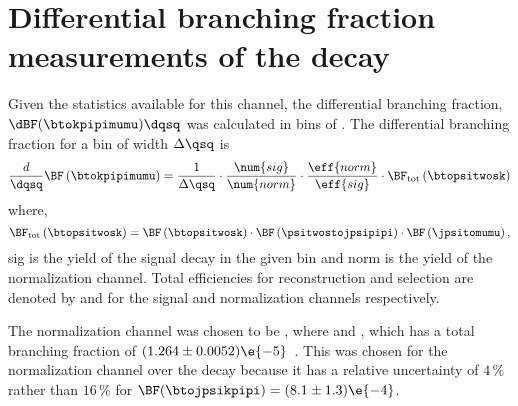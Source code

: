 \section[Differential branching fraction measurements of the decay \btokpipimumu]{
  Differential branching fraction measurements of the decay \tmath{\btokpipimumu}
}

Given the statistics available for this channel, the differential branching fraction,
$\dBF(\btokpipimumu)\dqsq$ was calculated in bins of \qsq.
The differential branching fraction for a bin of width $\Delta\qsq$ is
\begin{equation}
  \frac{d}{\dqsq}\BF\left(\btokpipimumu\right)
  =
  \frac{1}{\Delta\qsq} \cdot
  \frac{\num{sig}}{\num{norm}} \cdot
  \frac{\eff{norm}}{\eff{sig}} \cdot
  \BF_\mathrm{tot}\left(\btopsitwosk\right)
\end{equation}
where,
\begin{equation}
  \BF_\mathrm{tot}\left(\btopsitwosk\right)
  =
  \BF\left(\btopsitwosk\right) \cdot
  \BF\left(\psitwostojpsipipi\right) \cdot
  \BF\left(\jpsitomumu\right),
\end{equation}
\num{sig} is the yield of the signal decay \btokpipimumu in the given \qsq bin and \num{norm}
is the yield of the normalization channel.
Total efficiencies for reconstruction and selection are denoted by  and  for the
signal and normalization channels respectively.

The normalization channel was chosen to be \btopsitwosk, where \psitwostojpsipipi and \jpsitomumu,
which has a total branching fraction of $(1.264 \pm 0.0052)\e{-5}$~\cite{PDG2012}.
This was chosen for the normalization channel over the decay \btojpsikpipi because it has a relative
uncertainty of $4\,\%$ rather than $16\,\%$ for $\BF(\btojpsikpipi) = (8.1\pm1.3)\e{-4}$.


